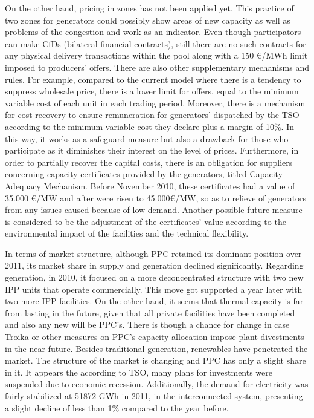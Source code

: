 \par On the other hand, pricing in zones has not been applied yet. This practice of two zones for generators could possibly show areas of new capacity as well as problems of the congestion and work as an indicator. Even though participators can make CfDs (bilateral financial contracts), still there are no such contracts for any physical delivery transactions within the pool along with a 150 \euro/MWh limit imposed to producers’ offers. There are also other supplementary mechanisms and rules. For example, compared to the current model where there is a tendency to suppress wholesale price, there is a lower limit for offers, equal to the minimum variable cost of each unit in each trading period. Moreover, there is a mechanism for cost recovery to ensure remuneration for generators’ dispatched by the TSO according to the minimum variable cost they declare plus a margin of 10\%. In this way, it works as a safeguard measure but also a drawback for those who participate as it diminishes their interest on the level of prices. Furthermore, in order to partially recover the capital costs, there is an obligation for suppliers concerning capacity certificates provided by the generators, titled Capacity Adequacy Mechanism. Before November 2010, these certificates had a value of 35.000 \euro/MW and after were risen to 45.000\euro/MW, so as to relieve of generators from any issues caused because of low demand. Another possible future measure is considered to be the adjustment of the certificates’ value according to the environmental impact of the facilities and the technical flexibility. 
\par In terms of market structure, although PPC retained its dominant position over 2011, its market share in supply and generation declined significantly. Regarding generation, in 2010, it focused on a more deconcentrated structure with two new IPP units that operate commercially. This move got supported a year later with two more IPP facilities. On the other hand, it seems that thermal capacity is far from lasting in the future, given that all private facilities have been completed and also any new will be PPC’s.  There is though a chance for change in case Troika or other measures on PPC’s capacity allocation impose plant divestments in the near future. Besides traditional generation, renewables have penetrated the market. The structure of the market is changing and PPC has only a slight share in it. It appears the according to TSO, many plans for investments were suspended due to economic recession. Additionally, the demand for electricity was fairly stabilized at 51872 GWh in 2011, in the interconnected system, presenting a slight decline of less than 1\% compared to the year before. 
